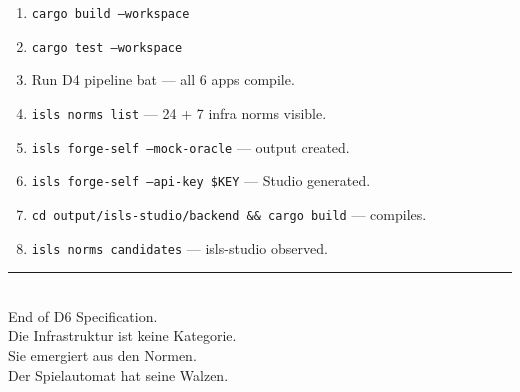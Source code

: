 \documentclass[11pt,a4paper]{article}
\begin{document}
\begin{enumerate}
\item \texttt{cargo build --workspace}
\item \texttt{cargo test --workspace}
\item Run D4 pipeline bat --- all 6 apps compile.
\item \texttt{isls norms list} --- 24 + 7 infra norms visible.
\item \texttt{isls forge-self --mock-oracle} --- output created.
\item \texttt{isls forge-self --api-key \$KEY} --- Studio generated.
\item \texttt{cd output/isls-studio/backend \&\& cargo build} --- 
      compiles.
\item \texttt{isls norms candidates} --- isls-studio observed.
\end{enumerate}

\vfill
\begin{center}
\color{isls-gray}\rule{0.5\textwidth}{0.4pt}\\[0.5em]
{\small End of D6 Specification.\\[0.3em]
Die Infrastruktur ist keine Kategorie.\\
Sie emergiert aus den Normen.\\
Der Spielautomat hat seine Walzen.}
\end{center}
\end{document}

